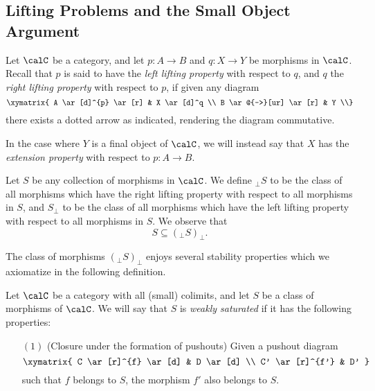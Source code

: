 \begin{CategoryTheory}
\subsection{Lifting Problems and the Small Object Argument}\label{liftingprobs}

Let $\calC$ be a category, and let $p: A \rightarrow B$ and $q: X
\rightarrow Y$ be morphisms in $\calC$. Recall that $p$ is said to
have the {\it left lifting property} with respect to $q$, and $q$
the {\it right lifting property} with respect to $p$, if given any diagram
$$ \xymatrix{ A \ar[d]^{p} \ar[r] & X \ar[d]^q \\
B \ar@{-->}[ur] \ar[r] & Y \\} $$
there exists a dotted arrow as indicated, rendering the diagram commutative.

\begin{remark}
In the case where $Y$ is a final object of $\calC$, we will instead say that
$X$ has the {\it extension property} with respect to $p: A \rightarrow B$.
\end{remark}

Let $S$ be any collection of morphisms in $\calC$. We define
$_{\perp} S$ to be the class of all morphisms which have the right
lifting property with respect to all morphisms in $S$, and $S_{\perp}$
to be the class of all morphisms which have the left lifting
property with respect to all morphisms in $S$. We observe that
$$S \subseteq (_{\perp}S)_{\perp}.$$

The class of morphisms $(_{\perp} S)_{\perp}$ enjoys several
stability properties which we axiomatize in the following definition.

\begin{definition}\label{saturated}
Let $\calC$ be a category with all (small) colimits, and let $S$ be a class of morphisms of $\calC$. We will say that $S$ is {\it weakly saturated} if it has the following properties:

\begin{itemize}
\item[$(1)$] (Closure under the formation of pushouts) Given a pushout diagram
$$ \xymatrix{ C \ar[r]^{f} \ar[d] & D \ar[d] \\
C' \ar[r]^{f'} & D' }$$
such that $f$ belongs to $S$, the morphism $f'$ also belongs to $S$. 


\end{itemize}
\end{definition}
\end{CategoryTheory}
